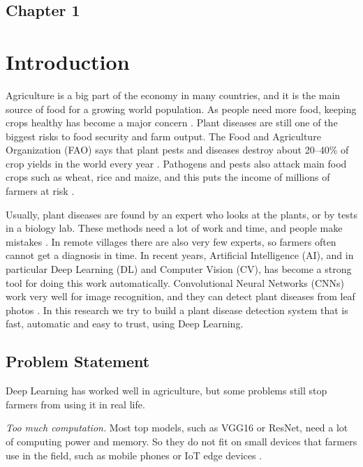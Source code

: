 \begin{center}
    \section*{\fontsize{20}{20}\selectfont Chapter 1}
\end{center}
\vspace{10mm}
\section{Introduction}

Agriculture is a big part of the economy in many countries, and it is the main source of food for a growing world population. As people need more food, keeping crops healthy has become a major concern \cite{fao2017future}. Plant diseases are still one of the biggest risks to food security and farm output. The Food and Agriculture Organization (FAO) says that plant pests and diseases destroy about 20--40\% of crop yields in the world every year \cite{strange2005plant}. Pathogens and pests also attack main food crops such as wheat, rice and maize, and this puts the income of millions of farmers at risk \cite{savary2019global}.

Usually, plant diseases are found by an expert who looks at the plants, or by tests in a biology lab. These methods need a lot of work and time, and people make mistakes \cite{barbedo2018factors}. In remote villages there are also very few experts, so farmers often cannot get a diagnosis in time. In recent years, Artificial Intelligence (AI), and in particular Deep Learning (DL) and Computer Vision (CV), has become a strong tool for doing this work automatically. Convolutional Neural Networks (CNNs) work very well for image recognition, and they can detect plant diseases from leaf photos \cite{lecun2015deep}. In this research we try to build a plant disease detection system that is fast, automatic and easy to trust, using Deep Learning.

\subsection{Problem Statement}
Deep Learning has worked well in agriculture, but some problems still stop farmers from using it in real life.

\textit{Too much computation.} Most top models, such as VGG16 or ResNet, need a lot of computing power and memory. So they do not fit on small devices that farmers use in the field, such as mobile phones or IoT edge devices \cite{sandler2018mobilenetv2}.

